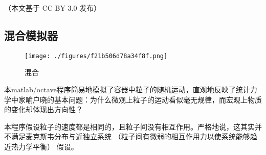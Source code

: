 
（本文基于 CC BY 3.0 发布）

\subsection{混合模拟器}
\begin{figure}[ht]
\centering
\texttt{[image: ./figures/f21b506d78a34f8f.png]}
\caption{混合} \label{fig_DIFMIX_1}
\end{figure}

本matlab/octave程序简易地模拟了容器中粒子的随机运动，直观地反映了统计力学中家喻户晓的基本问题：为什么微观上粒子的运动看似毫无规律，而宏观上物质的变化却体现出方向性？

本程序假设粒子的速度都是相同的，且粒子间没有相互作用。严格地说，这其实并不满足麦克斯韦分布与近独立系统 （粒子间有微弱的相互作用力以使系统能够趋近热力学平衡） 假设。
